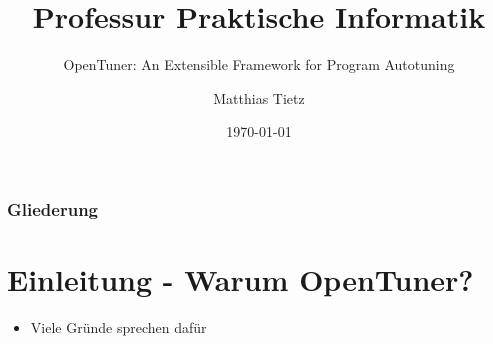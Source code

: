 
\usepackage[utf8]{inputenc}
\usepackage{babel}





%
%


\title{Professur Praktische Informatik}
\subtitle{OpenTuner: An Extensible Framework for Program Autotuning}
\author{Matthias Tietz}




\date{\today}
\institute[TUC]


    \tucthreeheadlines

    \begin{frame}
        \titlepage
    \end{frame}

    \tucnarrowframe
    \begingroup

    \begin{frame}
        \frametitle{Gliederung}
        \tableofcontents
    \end{frame}

    \endgroup
    \tucwideframe
    \tuctwoheadlines


    \section{Einleitung - Warum OpenTuner?}


    \begin{frame}
    \begin{itemize}
      \item Viele Gründe sprechen dafür
    \end{itemize}
    \end{frame}


